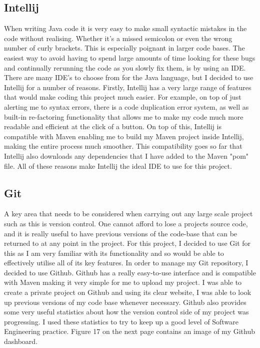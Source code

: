 \subsection{Intellij \label{intellij}}

When writing Java code it is very easy to make small syntactic mistakes in the code without realising. Whether it's a missed semicolon or even the wrong number of curly brackets. This is especially poignant in larger code bases. The easiest way to avoid having to spend large amounts of time looking for these bugs and continually rerunning the code as you slowly fix them, is by using an IDE. There are many IDE's to choose from for the Java language, but I decided to use Intellij for a number of reasons. Firstly, Intellij has a very large range of features that would make coding this project much easier. For example, on top of just alerting me to syntax errors, there is a code duplication error system, as well as built-in re-factoring functionality that allows me to make my code much more readable and efficient at the click of a button. On top of this, Intellij is compatible with Maven enabling me to build my Maven project inside Intellij, making the entire process much smoother. This compatibility goes so far that Intellij also downloads any dependencies that I have added to the Maven "pom" file. All of these reasons make Intellij the ideal IDE to use for this project.

\subsection{Git \label{git}}

A key area that needs to be considered when carrying out any large scale project such as this is version control. One cannot afford to lose a projects source code, and it is really useful to have previous versions of the code-base that can be returned to at any point in the project. For this project, I decided to use Git for this as I am very familiar with its functionality and so would be able to effectively utilise all of its key features. In order to manage my Git repository, I decided to use Github. Github has a really easy-to-use interface and is compatible with Maven making it very simple for me to upload my project. I was able to create a private project on Github and using its clear website, I was able to look up previous versions of my code base whenever necessary. Github also provides some very useful statistics about how the version control side of my project was progressing. I used these statistics to try to keep up a good level of Software Engineering practice. Figure 17 on the next page contains an image of my Github dashboard.

